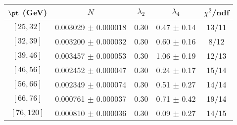 \begin{tabular}{c||c|c|c|c}
$\pt$ (GeV) & $N$ & $\lambda_{2}$ & $\lambda_4$  & $\chi^2$/ndf  \\
\hline
$[25, 32]$ & 0.003029 $\pm$ 0.000018 & 0.30 & 0.47 $\pm$ 0.14 & 13/11\\
$[32, 39]$ & 0.003200 $\pm$ 0.000032 & 0.30 & 0.60 $\pm$ 0.16 & 8/12\\
$[39, 46]$ & 0.003457 $\pm$ 0.000053 & 0.30 & 1.06 $\pm$ 0.19 & 12/13\\
$[46, 56]$ & 0.002452 $\pm$ 0.000047 & 0.30 & 0.24 $\pm$ 0.17 & 15/14\\
$[56, 66]$ & 0.002349 $\pm$ 0.000074 & 0.30 & 0.51 $\pm$ 0.27 & 14/14\\
$[66, 76]$ & 0.000761 $\pm$ 0.000037 & 0.30 & 0.71 $\pm$ 0.42 & 19/14\\
$[76, 120]$ & 0.000810 $\pm$ 0.000036 & 0.30 & 0.09 $\pm$ 0.27 & 14/15\\
\end{tabular}

